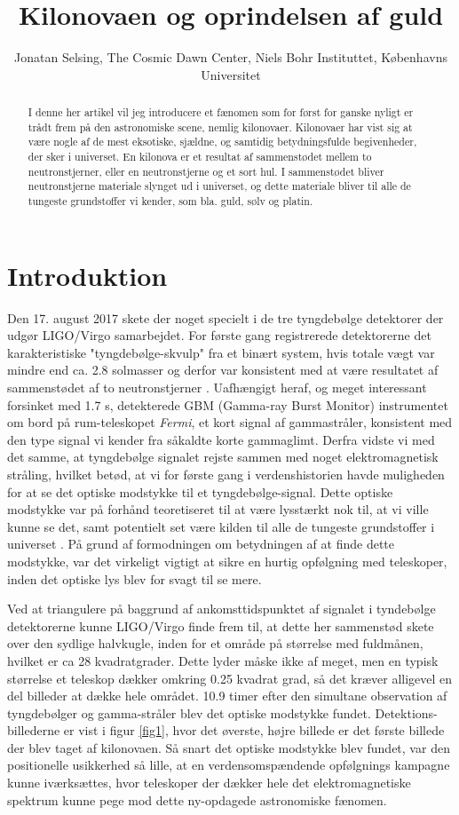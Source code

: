 \documentclass[twocolumn]{article}
\title{Kilonovaen og oprindelsen af guld}
\author{Jonatan Selsing, The Cosmic Dawn Center, Niels Bohr Instituttet, Københavns Universitet}
\date{\vspace{-3ex}}
\begin{document}
\maketitle


\begin{abstract}
I denne her artikel vil jeg introducere et fænomen som for først for ganske nyligt er trådt frem på den astronomiske scene, nemlig kilonovaer. Kilonovaer har vist sig at være nogle af de mest eksotiske, sjældne, og samtidig betydningsfulde begivenheder, der sker i universet. En kilonova er et resultat af sammenstødet mellem to neutronstjerner, eller en neutronstjerne og et sort hul. I sammenstødet bliver neutronstjerne materiale slynget ud i universet, og dette materiale bliver til alle de tungeste grundstoffer vi kender, som bla. guld, sølv og platin. 
\end{abstract}

\section{Introduktion}
Den 17. august 2017 skete der noget specielt i de tre tyngdebølge detektorer der udgør LIGO/Virgo samarbejdet. For første gang registrerede detektorerne det karakteristiske "tyngdebølge-skvulp" fra et binært system, hvis totale vægt var mindre end ca. 2.8 solmasser og derfor var konsistent med at være resultatet af sammenstødet af to neutronstjerner \cite{abbotta}. Uafhængigt heraf, og meget interessant forsinket med 1.7 s, detekterede GBM (Gamma-ray Burst Monitor) instrumentet om bord på rum-teleskopet \textit{Fermi}, et kort signal af gammastråler, konsistent med den type signal vi kender fra såkaldte korte gammaglimt. Derfra vidste vi med det samme, at tyngdebølge signalet rejste sammen med noget elektromagnetisk stråling, hvilket betød, at vi for første gang i verdenshistorien havde muligheden for at se det optiske modstykke til et tyngdebølge-signal. Dette optiske modstykke var på forhånd teoretiseret til at være lysstærkt nok til, at vi ville kunne se det, samt potentielt set være kilden til alle de tungeste grundstoffer i universet \cite{lattimer}. På grund af formodningen om betydningen af at finde dette modstykke, var det virkeligt vigtigt at sikre en hurtig opfølgning med teleskoper, inden det optiske lys blev for svagt til se mere. 

Ved at triangulere på baggrund af ankomsttidspunktet af signalet i tyndebølge detektorerne kunne LIGO/Virgo finde frem til, at dette her sammenstød skete over den sydlige halvkugle, inden for et område på størrelse med fuldmånen, hvilket er ca 28 kvadratgrader. Dette lyder måske ikke af meget, men en typisk størrelse et teleskop dækker omkring 0.25 kvadrat grad, så det kræver alligevel en del billeder at dække hele området. 10.9 timer efter den simultane observation af tyngdebølger og gamma-stråler blev det optiske modstykke fundet. Detektions-billederne er vist i figur \ref{fig1}, hvor det øverste, højre billede er det første billede der blev taget af kilonovaen. Så snart det optiske modstykke blev fundet, var den positionelle usikkerhed så lille, at en verdensomspændende opfølgnings kampagne kunne iværksættes, hvor teleskoper der dækker hele det elektromagnetiske spektrum kunne pege mod dette ny-opdagede astronomiske fænomen.
\end{document}
